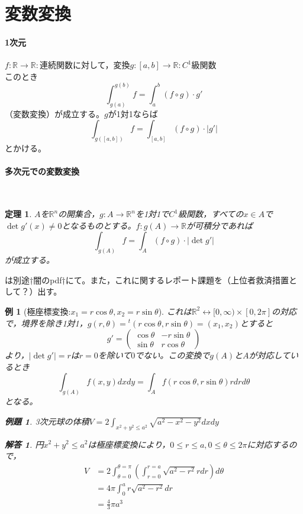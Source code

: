 \documentclass[dvipdfmx,a4j,10pt]{jsarticle}
\makeatletter
\theoremstyle{mystyle1}
\newtheorem{thm}[dfn]{定理}
\theoremstyle{mystyle2}
\newtheorem{ex}{例題}
\newtheorem{example}{例}
\newtheorem{ans}{解答}
\renewenvironment{proof}[1][\proofname]{\par
  \pushQED{\qed}%
  \normalfont
  \topsep6\p@\@plus6\p@ \trivlist
  \item[\hskip\labelsep{\bfseries\sffamily #1}]\ignorespaces
}{%
  \popQED\endtrivlist\@endpefalse
}
\renewcommand\proofname{証明}
\makeatother
\begin{document}
\section{変数変換}
\paragraph{1次元}
$f:\mathbb{R}\to\mathbb{R}:$連続関数に対して，変換$g:[a,b]\to\mathbb{R}:C^1$級関数\\
このとき
\[
	\int_{g(a)}^{g(b)}f = \int_a^b(f\circ g)\cdot g'
\]
（変数変換）が成立する。$g$が1対1ならば
\[
	\int_{g([a,b])}f=\int_{[a,b]}(f\circ g)\cdot|g'|
\]
とかける。

\paragraph{多次元での変数変換}\

\begin{framed}
	\begin{thm} \label{th3.11}
		$A$を$\mathbb{R}^n$の開集合，$g:A\to\mathbb{R}^n$を1対1で$C^1$級関数，すべての$x\in A$で$\det g'(x)\neq 0$となるものとする。$f:g(A)\to\mathbb{R}$が可積分であれば
		\[
			\int_{g(A)}f=\int_A(f\circ g)\cdot|\det g'|
		\]
		が成立する。
	\end{thm}
\end{framed}

\begin{proof}
	は別途†闇のpdf†にて。また，これに関するレポート課題を（上位者救済措置として？）出す。
\end{proof}

\begin{example}[極座標変換:$x_1=r\cos\theta,x_2=r\sin\theta$]
これは$\mathbb{R}^2\leftrightarrow [0,\infty)\times[0,2\pi]$の対応で，境界を除き1対1，$g(r,\theta)={}^t(r\cos\theta,r\sin\theta)=(x_1,x_2)$とすると
\[
	g'=
	\begin{pmatrix}
	\cos\theta & -r\sin\theta \\
	\sin\theta & r\cos\theta
	\end{pmatrix}
\]
より，$|\det g'|=r$は$r=0$を除いて$0$でない。この変換で$g(A)$と$A$が対応しているとき
\[
	\int_{g(A)}f(x,y)dxdy=\int_A f(r\cos\theta,r\sin\theta)rdrd\theta
\]
となる。
\begin{ex}
	3次元球の体積$\displaystyle V=2\int_{x^2+y^2\leq a^2}\sqrt{a^2-x^2-y^2}dxdy$
\end{ex}

\begin{ans}

円$x^2+y^2\leq a^2$は極座標変換により，$0\leq r\leq a,0\leq \theta\leq 2\pi$に対応するので，
\[
\begin{split}
	V&=2\int_{\theta=0}^{\theta=\pi}\left(\int_{r=0}^{r=a}\sqrt{a^2-r^2}rdr\right)d\theta\\
	&=4\pi\int_0^a r\sqrt{a^2-r^2}dr\\
	&=\frac{4}{3}\pi a^3
\end{split}
\]

\end{ans}

\end{example}
\end{document}
